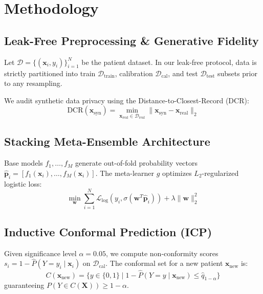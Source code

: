 \documentclass[10pt,journal,compsoc]{IEEEtran}
\begin{document}
\section{Methodology}

\subsection{Leak-Free Preprocessing \& Generative Fidelity}
Let $\mathcal{D} = \{(\mathbf{x}_i, y_i)\}_{i=1}^N$ be the patient dataset. In our leak-free protocol, data is strictly partitioned into train $\mathcal{D}_{\text{train}}$, calibration $\mathcal{D}_{\text{cal}}$, and test $\mathcal{D}_{\text{test}}$ subsets prior to any resampling.

We audit synthetic data privacy using the Distance-to-Closest-Record (DCR):
\begin{equation}
\text{DCR}(\mathbf{x}_{\text{syn}}) = \min_{\mathbf{x}_{\text{real}} \in \mathcal{D}_{\text{real}}} \|\mathbf{x}_{\text{syn}} - \mathbf{x}_{\text{real}}\|_2
\end{equation}

\subsection{Stacking Meta-Ensemble Architecture}
Base models $f_1, \dots, f_M$ generate out-of-fold probability vectors $\hat{\mathbf{p}}_i = [f_1(\mathbf{x}_i), \dots, f_M(\mathbf{x}_i)]$. The meta-learner $g$ optimizes $L_2$-regularized logistic loss:
\begin{equation}
\min_{\mathbf{w}} \sum_{i=1}^N \mathcal{L}_{\text{log}}\left(y_i, \sigma(\mathbf{w}^T \hat{\mathbf{p}}_i)\right) + \lambda \|\mathbf{w}\|_2^2
\end{equation}

\subsection{Inductive Conformal Prediction (ICP)}
Given significance level $\alpha = 0.05$, we compute non-conformity scores $s_i = 1 - \hat{P}(Y = y_i \mid \mathbf{x}_i)$ on $\mathcal{D}_{\text{cal}}$. The conformal set for a new patient $\mathbf{x}_{\text{new}}$ is:
\begin{equation}
C(\mathbf{x}_{\text{new}}) = \{y \in \{0, 1\} \mid 1 - \hat{P}(Y = y \mid \mathbf{x}_{\text{new}}) \le \hat{q}_{1-\alpha}\}
\end{equation}
guaranteeing $P(Y \in C(\mathbf{X})) \ge 1 - \alpha$.
\end{document}

